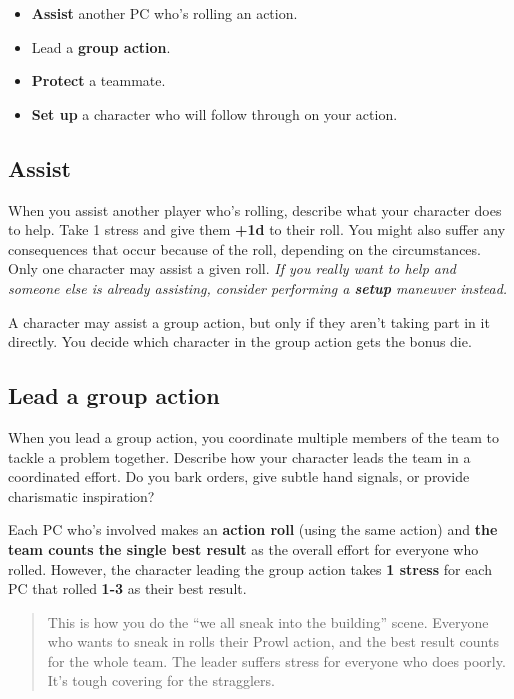 \documentclass[11pt,fleqn,a5paper]{book}
\newcommand{\gameterm}[1]{\textbf{#1}}
\begin{document}
\begin{itemize}
	\item \textbf{Assist} another PC who’s rolling an action.
	\item Lead a \textbf{group action}.
	\item \textbf{Protect} a teammate.
	\item \textbf{Set up} a character who will follow through on your action.
\end{itemize}

\subsection{Assist}

When you assist another player who’s rolling, describe what your character does to help. Take 1 stress and give them \textbf{+1d} to their roll. You might also suffer any consequences that occur because of the roll, depending on the circumstances. Only one character may assist a given roll.\emph{ If you really want to help and someone else is already assisting, consider performing a \textbf{setup} maneuver instead.}

A character may assist a group action, but only if they aren’t taking part in it directly. You decide which character in the group action gets the bonus die.

\subsection{Lead a group action}

When you lead a group action, you coordinate multiple members of the team to tackle a problem together. Describe how your character leads the team in a coordinated effort. Do you bark orders, give subtle hand signals, or provide charismatic inspiration?

Each PC who’s involved makes an \textbf{action roll} (using the same action) and \textbf{the team counts the single best result} as the overall effort for everyone who rolled. However, the character leading the group action takes \textbf{1 stress} for each PC that rolled\gameterm{ 1-3}  as their best result.

\begin{quote}
	This is how you do the “we all sneak into the building” scene. Everyone who wants to sneak in rolls their Prowl action, and the best result counts for the whole team. The leader suffers stress for everyone who does poorly. It’s tough covering for the stragglers.
\end{quote} 
\end{document}
